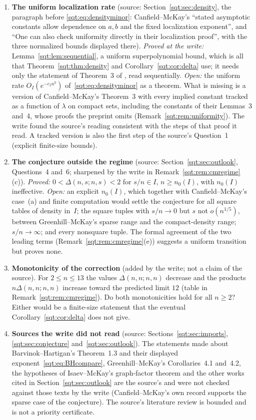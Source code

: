 \begin{enumerate}
\item\label{sqt:q:uniform} \textbf{The uniform localization rate} (source:
 Section~\ref{sqt:sec:density}, the paragraph before
 \eqref{sqt:eq:densityminor}: Canfield--McKay's ``stated asymptotic constants
 allow dependence on $a,b$ and the fixed localization exponent'', and ``One
 can also check uniformity directly in their localization proof'', with the
 three normalized bounds displayed there). \emph{Proved at the write:}
 Lemma~\ref{sqt:lem:sequential}, a uniform superpolynomial bound, which is
 all that Theorem~\ref{sqt:thm:density} and Corollary~\ref{sqt:cor:delta}
 use; it needs only the statement of Theorem~3 of \cite{CM}, read
 sequentially. \emph{Open:} the uniform rate
 $O_I(e^{-c_In^\eta})$ of~\eqref{sqt:eq:densityminor} as a theorem. What is
 missing is a version of Canfield--McKay's Theorem~3 with every implied
 constant tracked as a function of $\lambda$ on compact sets, including the
 constants of their Lemmas~3 and~4, whose proofs the preprint omits
 (Remark~\ref{sqt:rem:uniformity}). The write found the source's reading
 consistent with the steps of that proof it read. A tracked version is also
 the first step of the source's Question~1 (explicit finite-size bounds).
\item\label{sqt:q:regime} \textbf{The conjecture outside the regime} (source:
 Section~\ref{sqt:sec:outlook}, Questions~4 and~6; sharpened by the write in
 Remark~\ref{sqt:rem:cmregime}(c)). \emph{Proved:} $0<\Delta(n,s;n,s)<2$ for
 $s/n\in I$, $n\ge n_0(I)$, with $n_0(I)$ ineffective. \emph{Open:} an
 explicit $n_0(I)$, which together with Canfield--McKay's case~(a) and finite
 computation would settle the conjecture for all square tables of density
 in~$I$; the square tuples with $s/n\to0$ but $s$ not $o(n^{1/5})$, between
 Greenhill--McKay's sparse range and the compact-density range; $s/n\to\infty$;
 and every nonsquare tuple. The formal agreement of the two leading terms
 (Remark~\ref{sqt:rem:cmregime}(e)) suggests a uniform transition but proves
 none.
\item\label{sqt:q:monotone} \textbf{Monotonicity of the correction}
 (added by the write; not a claim of the source). For $2\le n\le13$ the
 values $\Delta(n,n;n,n)$ decrease and the products $n\Delta(n,n;n,n)$
 increase toward the predicted limit $12$ (table in
 Remark~\ref{sqt:rem:cmregime}). Do both monotonicities hold for all $n\ge2$?
 Either would be a finite-size statement that the eventual
 Corollary~\ref{sqt:cor:delta} does not give.
\item\label{sqt:q:literature} \textbf{Sources the write did not read}
 (source: Sections~\ref{sqt:sec:imports}, \ref{sqt:sec:conjecture}
 and~\ref{sqt:sec:outlook}). The statements made about Barvinok--Hartigan's
 Theorem~1.3 and their displayed exponent~\eqref{sqt:eq:BHcompare},
 Greenhill--McKay's Corollaries~4.1 and~4.2, the hypotheses of
 Isaev--McKay's graph-factor theorem and the other works cited in
 Section~\ref{sqt:sec:outlook} are the source's and were not checked against
 those texts by the write (Canfield--McKay's own record supports the
 sparse case of the conjecture). The source's literature review is bounded
 and is not a priority certificate.
\end{enumerate}
